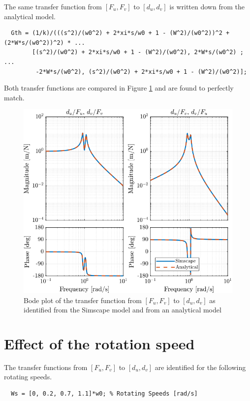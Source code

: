 \documentclass[a4paper, 10pt, DIV=12, parskip=full]{scrreprt}
\begin{document}
The same transfer function from \([F_u, F_v]\) to \([d_u, d_v]\) is written down from the analytical model.
\begin{verbatim}
  Gth = (1/k)/(((s^2)/(w0^2) + 2*xi*s/w0 + 1 - (W^2)/(w0^2))^2 + (2*W*s/(w0^2))^2) * ...
        [(s^2)/(w0^2) + 2*xi*s/w0 + 1 - (W^2)/(w0^2), 2*W*s/(w0^2) ; ...
         -2*W*s/(w0^2), (s^2)/(w0^2) + 2*xi*s/w0 + 1 - (W^2)/(w0^2)];
\end{verbatim}

Both transfer functions are compared in Figure \ref{fig:plant_simscape_analytical} and are found to perfectly match.

\begin{figure}[htbp]
\centering
\includegraphics[scale=1]{figs/plant_simscape_analytical.png}
\caption{\label{fig:plant_simscape_analytical}Bode plot of the transfer function from \([F_u, F_v]\) to \([d_u, d_v]\) as identified from the Simscape model and from an analytical model}
\end{figure}

\section{Effect of the rotation speed}
\label{sec:org6d643e3}
The transfer functions from \([F_u, F_v]\) to \([d_u, d_v]\) are identified for the following rotating speeds.
\begin{verbatim}
  Ws = [0, 0.2, 0.7, 1.1]*w0; % Rotating Speeds [rad/s]
\end{verbatim}
\end{document}
